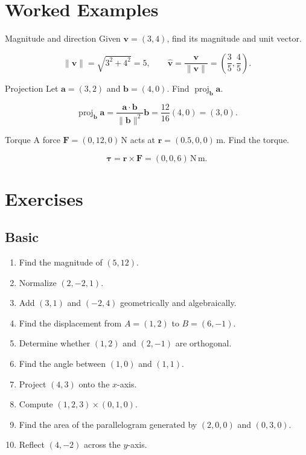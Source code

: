 \section*{Worked Examples}

\begin{workedexample}{Magnitude and direction}
Given $\mathbf v=(3,4)$, find its magnitude and unit vector.
\end{workedexample}
\begin{solution}
\[
\|\mathbf v\|=\sqrt{3^2+4^2}=5,
\qquad
\hat{\mathbf v}=\frac{\mathbf v}{\|\mathbf v\|}
=\left(\frac35,\frac45\right).
\]
\end{solution}

\begin{workedexample}{Projection}
Let $\mathbf a=(3,2)$ and $\mathbf b=(4,0)$. Find
$\operatorname{proj}_{\mathbf b}\mathbf a$.
\end{workedexample}
\begin{solution}
\[
\operatorname{proj}_{\mathbf b}\mathbf a
=
\frac{\mathbf a\cdot\mathbf b}{\|\mathbf b\|^2}\mathbf b
=
\frac{12}{16}(4,0)
=
(3,0).
\]
\end{solution}

\begin{workedexample}{Torque}
A force $\mathbf F=(0,12,0)\,\mathrm N$ acts at
$\mathbf r=(0.5,0,0)\,\mathrm m$. Find the torque.
\end{workedexample}
\begin{solution}
\[
\boldsymbol\tau=\mathbf r\times\mathbf F
=(0,0,6)\,\mathrm{N\,m}.
\]
\end{solution}

\section*{Exercises}

\subsection*{Basic}
\begin{enumerate}
  \item Find the magnitude of $(5,12)$.
  \item Normalize $(2,-2,1)$.
  \item Add $(3,1)$ and $(-2,4)$ geometrically and algebraically.
  \item Find the displacement from $A=(1,2)$ to $B=(6,-1)$.
  \item Determine whether $(1,2)$ and $(2,-1)$ are orthogonal.
  \item Find the angle between $(1,0)$ and $(1,1)$.
  \item Project $(4,3)$ onto the $x$-axis.
  \item Compute $(1,2,3)\times(0,1,0)$.
  \item Find the area of the parallelogram generated by $(2,0,0)$ and $(0,3,0)$.
  \item Reflect $(4,-2)$ across the $y$-axis.
\end{enumerate}

